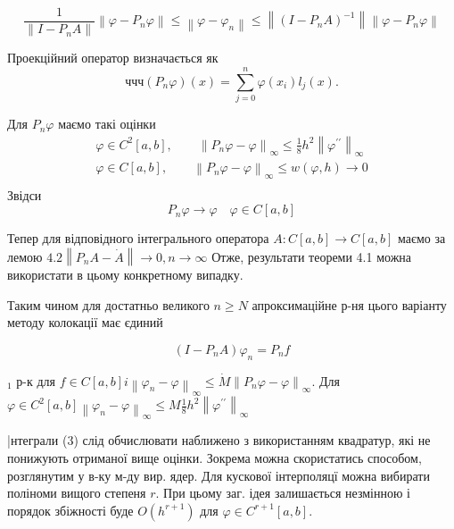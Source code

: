 \documentclass[14pt,a4paper]{extarticle}
\newcounter{e}
\numberwithin{equation}{section}
\begin{document}
 \begin{equation}
	 \frac{1}{\left\|I-P_{n} A\right\|}\left\|\varphi-P_{n} \varphi\right\| \leq\left\|\varphi-\varphi_{n}\right\| \leq\left\|\left(I-P_{n} A\right)^{-1}\right\|\left\|\varphi-P_{n} \varphi\right\|
 \end{equation}
 
 
Проекційний оператор визначається як
 $$ччч
 \left(P_{n} \varphi\right)(x)= \sum_{j=0}^{n} \varphi\left(x_{i}\right) l_{j}(x) .
 $$
 
 Для $P_{n} \varphi$ маємо такі оцінки 
 $$
 \begin{array}{l}
 	\displaystyle
	\varphi \in C^{2}[a, b], \quad \quad \left\|P_{n} \varphi-\varphi\right\|_{\infty} \leq \frac{1}{8} h^{2}\left\|\varphi^{\prime \prime}\right\|_{\infty}  
	\\[0.3cm]
 	
 	\displaystyle
	\varphi \in C[a, b], \quad \quad \left\|P_{n} \varphi-\varphi\right\|_{\infty} \leq w(\varphi, h) \rightarrow 0
	\\[0.3cm]	
\end{array}
 $$
 Звідси 
 $$ 
 P_{n} \varphi \rightarrow \varphi  \quad  \varphi \in C[a, b]
 $$
 
 Тепер для відповідного інтегрального оператора $A: C[a, b] \rightarrow C[a, b]$ маємо за лемою $4.2\left\|P_{n} A-\dot{A}\right\| \rightarrow 0, n \rightarrow \infty$
 Отже, результати теореми 4.1 можна використати в цьому конкретному випадку. 
 

 Таким чином для достатньо великого $n \geq N$ апроксимаційне р-ня цього варіанту методу колокації  має єдиний
 
\begin{equation}
\left(I-P_{n} A\right) \varphi_{n}=P_{n} f
\end{equation}
 
 $_{1}$ р-к для $f \in C[a, b] i\left\|\varphi_{n}-\varphi\right\|_{\infty} \leq \dot{M}\left\|P_{n} \varphi-\varphi\right\|_{\infty}$. Для
 $\varphi \in C^{2}[a, b]\left\|\varphi_{n}-\varphi\right\|_{\infty} \leq M \frac{1}{8} h^{2}\left\|\varphi^{\prime \prime}\right\|_{\infty}$


 |нтеграли (3) слід обчислювати наближено з використанням квадратур, які не понижують отриманої вище оцінки. Зокрема можна скористатись способом, розглянутим у в-ку м-ду вир. ядер.
 Для кускової інтерполяцї можна вибирати поліноми вищого степеня $r .$ При цьому заг. ідея залишається незмінною і порядок збіжності буде $O\left(h^{r+1}\right)$ для $\varphi \in C^{r+1}[a, b] .$
 
\end{document}
